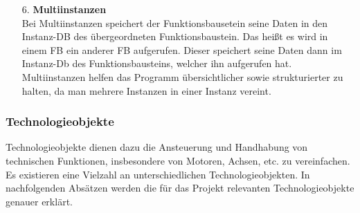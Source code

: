 \begin{itemize}
        \item[6.] \textbf{Multiinstanzen} \\
            Bei Multiinstanzen speichert der Funktionsbausetein seine Daten in den Instanz-DB des übergeordneten Funktionsbaustein. Das heißt es wird in einem FB ein anderer FB aufgerufen. Dieser speichert seine Daten dann im Instanz-Db des Funktionsbausteins, welcher ihn aufgerufen hat. Multiinstanzen helfen das Programm übersichtlicher sowie strukturierter zu halten, da man mehrere Instanzen in einer Instanz vereint.

    \end{itemize}

    \subsubsection{Technologieobjekte}
    Technologieobjekte dienen dazu die Ansteuerung und Handhabung von technischen Funktionen, insbesondere von Motoren, Achsen, etc. zu vereinfachen. Es existieren eine Vielzahl an unterschiedlichen Technologieobjekten. In nachfolgenden Absätzen werden die für das Projekt relevanten Technologieobjekte genauer erklärt.

